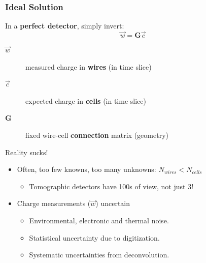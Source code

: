 \begin{frame}
  \frametitle{Ideal Solution}

  In a \textbf{perfect detector}, simply invert:
  \[\vec{w} = \mathbf{G} \vec{c}\]

  \begin{description}
  \item[$\vec{w}$] measured charge in \textbf{wires} (in time slice)
  \item[$\vec{c}$] expected charge in \textbf{cells} (in time slice)
  \item[$\mathbf{G}$] fixed wire-cell \textbf{connection} matrix (geometry)
  \end{description}

  Reality sucks!

  \begin{itemize}
  \item Often, too few knowns, too many unknowns: $N_{wires} < N_{cells}$
    \begin{itemize}\footnotesize
    \item Tomographic detectors have 100s of view, not just 3!
    \end{itemize}
  \item Charge measurements ($\vec{w}$) uncertain
    \begin{itemize}\footnotesize
    \item Environmental, electronic and thermal noise.
    \item Statistical uncertainty due to digitization.
    \item Systematic uncertainties from deconvolution.
    \end{itemize}
  \end{itemize}

\end{frame}


